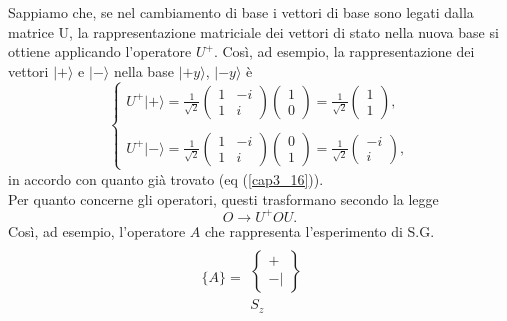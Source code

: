 \documentclass[a4paper,12pt,oneside]{book}
\begin{document}
Sappiamo che, se nel cambiamento di base i vettori di base sono legati dalla matrice U, la rappresentazione matriciale dei vettori di stato nella nuova base si ottiene applicando l'operatore $U^+$. Così, ad esempio, la rappresentazione dei vettori $| + \rangle $ e $| - \rangle $ nella base  $| +y \rangle $, $| -y \rangle $ è
	\begin{equation}
		\begin{cases}
		\displaystyle{U^+| + \rangle =\frac{1}{\sqrt{2}}
		\begin{pmatrix}
		1 & -i\\
		1 & i
		\end{pmatrix}
		\begin{pmatrix}
		1\\
		0
		\end{pmatrix}=
		\frac{1}{\sqrt{2}}
		\begin{pmatrix}
		1\\
		1
		\end{pmatrix} ,}\\
		\\
		\displaystyle{U^+| - \rangle =\frac{1}{\sqrt{2}}
		\begin{pmatrix}
		1 & -i\\
		1 & i
		\end{pmatrix}
		\begin{pmatrix}
		0\\
		1
		\end{pmatrix}=
		\frac{1}{\sqrt{2}}
		\begin{pmatrix}
		-i\\
		i
		\end{pmatrix} ,}
		\end{cases}
	\end{equation}
in accordo con quanto già trovato (eq (\ref{cap3_16})).\\

Per quanto concerne gli operatori, questi trasformano secondo la legge
	\begin{equation}
		\boxed{
			O \rightarrow U^+OU .
			}
	\end{equation}
Così, ad esempio, l'operatore $A$ che rappresenta l'esperimento di S.G.
	\begin{equation}
		\bigg\lbrace A\bigg\rbrace =
		\begin{matrix}
		\
		\\[0.25cm]
		\begin{Bmatrix}
		 +  \\ - |  
		\end{Bmatrix} \\[0.5cm]
		S_z&
		\end{matrix}
	\end{equation}
\end{document}
